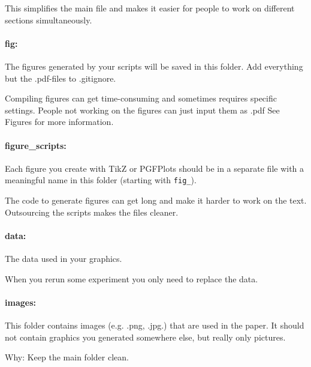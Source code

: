 	\why This simplifies the main file and makes it easier for people to work on different sections simultaneously.
	
	\paragraph{fig:} The figures generated by your scripts will be saved in this folder. Add everything but the .pdf-files to .gitignore.
	
	\why Compiling figures can get time-consuming and sometimes requires specific settings. People not working on the figures can just input them as .pdf See Figures for more information.
	
	\paragraph{figure\_scripts:} Each figure you create with TikZ or PGFPlots should be in a separate file with a meaningful name in this folder (starting with \verb|fig_|).
	
	\why The code to generate figures can get long and make it harder to work on the text. Outsourcing the scripts makes the files cleaner.
	
	\paragraph{data:} The data used in your graphics.
	
	\why When you rerun some experiment you only need to replace the data.
	
	\paragraph{images:} This folder contains images (e.g. .png, .jpg.) that are used in the paper. It should not contain graphics you generated somewhere else, but really only pictures.
	
	Why: Keep the main folder clean.
	
